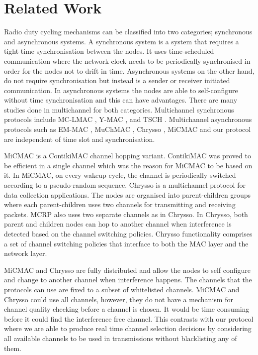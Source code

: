 \section{Related Work}
\label{sec:relatedwork}
Radio duty cycling mechanisms can be classified into two categories; synchronous and asynchronous systems. A synchronous system is a system that requires a tight time synchronisation between the nodes. It uses time-scheduled communication where the network clock needs to be periodically synchronised in order for the nodes not to drift in time. Asynchronous systems on the other hand, do not require synchronisation but instead is a sender or receiver initiated communication. In asynchronous systems the nodes are able to self-configure without time synchronisation and this can have advantages. There are many studies done in multichannel for both categories. Multichannel synchronous protocols include MC-LMAC \cite{mc-lmac}, Y-MAC \cite{y-mac}, and TSCH \cite{tsch}. Multichannel asynchronous protocols such as EM-MAC \cite{emmac}, MuChMAC \cite{muchmac}, Chrysso \cite{chrysso}, MiCMAC \cite{micmac} and our protocol are independent of time slot and synchronisation. 


MiCMAC \cite{micmac} is a ContikiMAC \cite{contikimac} channel hopping variant. ContikiMAC was proved to be efficient in a single channel \cite{micmac,orpl} which was the reason for MiCMAC to be based on it. In MiCMAC, on every wakeup cycle, the channel is periodically switched according to a pseudo-random sequence. Chrysso \cite{chrysso} is a multichannel protocol for data collection applications. The nodes are organised into parent-children groups where each parent-children uses two channels for transmitting and receiving packets. MCRP also uses two separate channels as in Chrysso. In Chrysso, both parent and children nodes can hop to another channel when interference is detected based on the channel switching policies. Chrysso functionality comprises a set of channel switching policies that interface to both the MAC layer and the network layer. 

MiCMAC and Chrysso are fully distributed and allow the nodes to self configure and change to another channel when interference happens. The channels that the protocols can use are fixed to a subset of whitelisted channels. MiCMAC and Chrysso could use all channels, however, they do not have a mechanism for channel quality checking before a channel is chosen. It would be time consuming before it could find the interference free channel. This contrasts with our protocol where we are able to produce real time channel selection decisions by considering all available channels to be used in transmissions without blacklisting any of them. 

